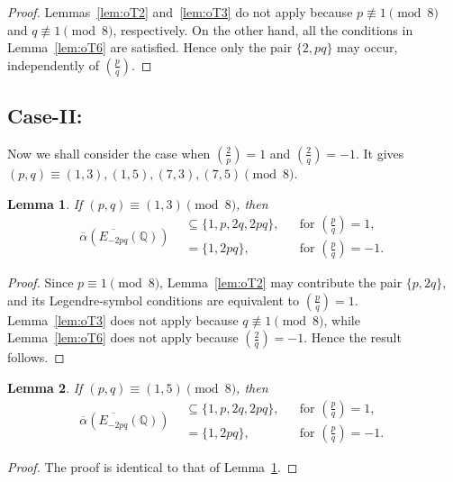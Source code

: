\documentclass[12pt]{amsart}
\newcommand{\bbQ}{\mathbb{Q}}
\newcommand{\legendre}[2]{\genfrac{(}{)}{}{}{#1}{#2}}
\numberwithin{equation}{section}
\newtheorem{lem}{Lemma}[section]
\theoremstyle{definition}
\begin{document}
\begin{proof}
Lemmas~\ref{lem:oT2} and~\ref{lem:oT3} do not apply because
$p\not\equiv1\pmod8$ and $q\not\equiv1\pmod8$, respectively. On the other hand,
all the conditions in Lemma~\ref{lem:oT6} are satisfied. Hence only the pair
$\{2,pq\}$ may occur, independently of $\legendre{p}{q}$.
\end{proof}



\subsection*{Case-II:} Now we shall consider the case when $\legendre{2}{p}=1$ and $\legendre{2}{q}=-1$. It gives $(p,q)\equiv (1,3),(1,5),(7,3),(7,5)\pmod 8$.


\begin{lem}
\label{lem:oalpha_2.1}
If $(p,q)\equiv (1,3)\pmod 8$, then
\[
\overline{\alpha}\left(\overline{E_{-2pq}}(\bbQ)\right)
\begin{aligned}
&\subseteq \{1,p,2q,2pq\},
&& \text{for } \legendre{p}{q}=1,\\
&= \{1,2pq\},
&& \text{for } \legendre{p}{q}=-1.
\end{aligned}
\]
\end{lem}

\begin{proof}
Since $p\equiv1\pmod8$, Lemma~\ref{lem:oT2} may contribute the pair
$\{p,2q\}$, and its Legendre-symbol conditions are equivalent to
$\legendre{p}{q}=1$. Lemma~\ref{lem:oT3} does not apply because
$q\not\equiv1\pmod8$, while Lemma~\ref{lem:oT6} does not apply because
$\legendre{2}{q}=-1$. Hence the result follows.
\end{proof}


\begin{lem}
\label{lem:oalpha_2.2}
If $(p,q)\equiv (1,5)\pmod 8$, then
\[
\overline{\alpha}\left(\overline{E_{-2pq}}(\bbQ)\right)
\begin{aligned}
&\subseteq \{1,p,2q,2pq\},
&& \text{for } \legendre{p}{q}=1,\\
&= \{1,2pq\},
&& \text{for } \legendre{p}{q}=-1.
\end{aligned}
\]
\end{lem}

\begin{proof}
The proof is identical to that of Lemma~\ref{lem:oalpha_2.1}.
\end{proof}
\end{document}
